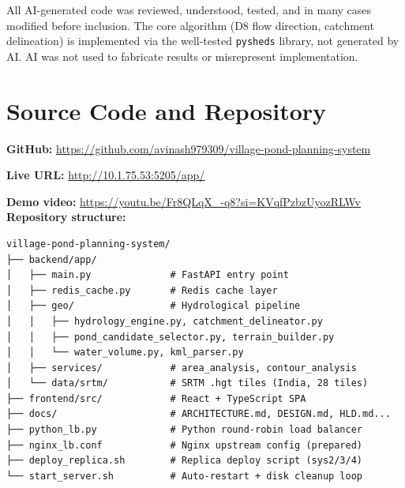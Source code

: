 \documentclass[manuscript,screen,review]{acmart}
\begin{document}
All AI-generated code was reviewed, understood, tested, and in many
cases modified before inclusion. The core algorithm (D8 flow
direction, catchment delineation) is implemented via the well-tested
\texttt{pysheds} library, not generated by AI. AI was not used to
fabricate results or misrepresent implementation.

\appendix

\section{Source Code and Repository}
\label{sec:repo}

\textbf{GitHub:}
\url{https://github.com/avinash979309/village-pond-planning-system}

\textbf{Live URL:}
\url{http://10.1.75.53:5205/app/}


\textbf{Demo video:}
\url{https://youtu.be/Fr8QLqX_-q8?si=KVqfPzbzUyozRLWv}
\quad \textit

\medskip
\noindent\textbf{Repository structure:}
\begin{verbatim}
village-pond-planning-system/
├── backend/app/
│   ├── main.py              # FastAPI entry point
│   ├── redis_cache.py       # Redis cache layer
│   ├── geo/                 # Hydrological pipeline
│   │   ├── hydrology_engine.py, catchment_delineator.py
│   │   ├── pond_candidate_selector.py, terrain_builder.py
│   │   └── water_volume.py, kml_parser.py
│   ├── services/            # area_analysis, contour_analysis
│   └── data/srtm/           # SRTM .hgt tiles (India, 28 tiles)
├── frontend/src/            # React + TypeScript SPA
├── docs/                    # ARCHITECTURE.md, DESIGN.md, HLD.md...
├── python_lb.py             # Python round-robin load balancer
├── nginx_lb.conf            # Nginx upstream config (prepared)
├── deploy_replica.sh        # Replica deploy script (sys2/3/4)
└── start_server.sh          # Auto-restart + disk cleanup loop
\end{verbatim}
\end{document}
